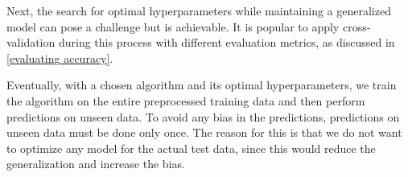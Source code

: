 Next, the search for optimal hyperparameters while maintaining a generalized model can pose a challenge but is achievable. It is popular to apply cross-validation during this process with different evaluation metrics, as discussed in \autoref{evaluating accuracy}.

Eventually, with a chosen algorithm and its optimal hyperparameters, we train the algorithm on the entire preprocessed training data and then perform predictions on unseen data. To avoid any bias in the predictions, predictions on unseen data must be done only once. The reason for this is that we do not want to optimize any model for the actual test data, since this would reduce the generalization and increase the bias.






